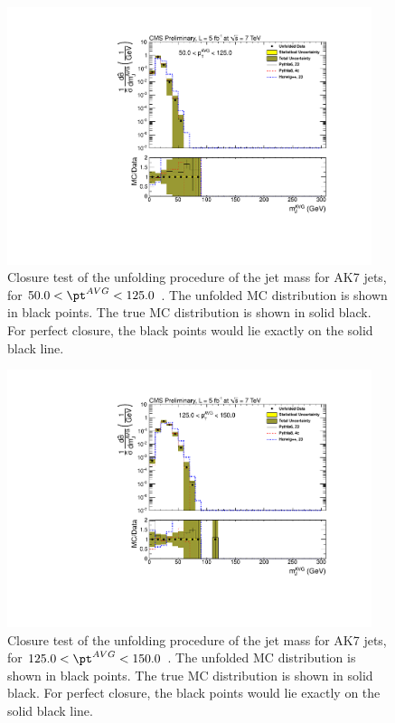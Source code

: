 \begin{figure}[htbp]
\centering
\includegraphics[width=0.95\textwidth]{figs/unfoldedMeasurementDijets_1_closuretest}
\caption{Closure test of the unfolding procedure of the jet mass for AK7 jets,
for $50.0 < \pt^{AVG} < 125.0$ \GeVc. The unfolded MC distribution is shown in black points.
The true MC distribution is shown in solid black. For perfect closure, the black points would
lie exactly on the solid black line.  
\label{figs:unfoldedMeasurementDijets_1_closuretest}}
\end{figure}



\begin{figure}[htbp]
\centering
\includegraphics[width=0.95\textwidth]{figs/unfoldedMeasurementDijets_2_closuretest}
\caption{Closure test of the unfolding procedure of the jet mass for AK7 jets,
for $125.0 < \pt^{AVG} < 150.0$ \GeVc. The unfolded MC distribution is shown in black points.
The true MC distribution is shown in solid black. For perfect closure, the black points would
lie exactly on the solid black line.  
\label{figs:unfoldedMeasurementDijets_2_closuretest}}
\end{figure}



